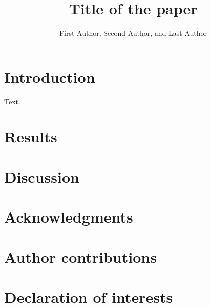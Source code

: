 \documentclass[brand=omicverse]{pdarticle}      %
\title{Title of the paper}
\author{First Author,\affmark{1} Second Author,\affmark{2} and Last Author\affmark{1,*}}
\affiliation{1}{[Department, Institution, City, Country]}
\affiliation{2}{[Department, Institution, City, Country]}
\begin{document}
\maketitle

\section{Introduction}

Text.\cite{zeng2024omicverse}

\section{Results}

\section{Discussion}

\section{Acknowledgments}

\section{Author contributions}

\section{Declaration of interests}


\end{document}
